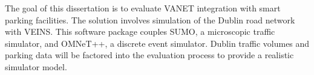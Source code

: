 
The goal of this dissertation is to evaluate VANET integration with smart parking facilities. The solution involves simulation of the Dublin road network with \ac{VEINS}. This software package couples \ac{SUMO}, a microscopic traffic simulator, and \ac{OMNeT++}, a discrete event simulator. Dublin traffic volumes and parking data will be factored into the evaluation process to provide a realistic simulator model.\\